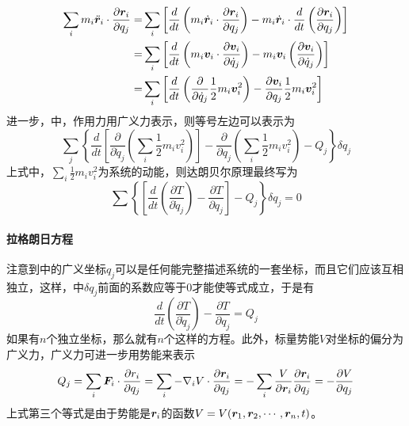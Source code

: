\begin{equation}
	\begin{aligned}
	\sum_{i} m_i \ddot{\bm{r}}_i\cdot\frac{\partial\bm{r}_i}{\partial q_j}
	=& \sum_{i}\left[\frac{d}{dt}\left(m_i\dot{\bm{r}}_i\cdot\frac{\partial\bm{r}_i}{\partial q_j}\right) - m_i\dot{\bm{r}}_i\cdot\frac{d}{dt}\left(\frac{\partial\bm{r}_i}{\partial q_j}\right)\right] \\
	=& \sum_{i}\left[\frac{d}{dt}\left(m_i\bm{v}_i\cdot\frac{\partial\bm{v}_i}{\partial \dot{q}_j}\right) - m_i\bm{v}_i\left(\frac{\partial\bm{v}_i}{\partial \dot{q}_j}\right)\right] \\
	=& \sum_{i}\left[\frac{d}{dt}\left(\frac{\partial}{\partial \dot{q}_j} \frac{1}{2}m_i\bm{v}_i^2\right) -\frac{\partial\bm{v}_i}{\partial q_j}\frac{1}{2} m_i\bm{v}_i^2\right]
	\end{aligned}
\end{equation}
进一步，中，作用力用广义力表示，则等号左边可以表示为
\begin{equation*}
	\sum_{j} \left\{\frac{d}{dt}\left[\frac{\partial}{\partial \dot{q}_j}\left(\sum_{i}\frac{1}{2}m_i v_i^2\right)\right] - \frac{\partial}{\partial q_j}\left(\sum_i \frac{1}{2}m_i v_i^2\right) - Q_j\right\}\delta q_j
\end{equation*}
上式中，$\sum_{i} \frac{1}{2}m_i v_i^2$为系统的动能，则达朗贝尔原理最终写为
\begin{equation}
	\sum \left\{ \left[\frac{d}{dt}\left(\frac{\partial T}{\partial \dot{q}_j}\right) - \frac{\partial T}{\partial q_j}\right] - Q_j \right\} \delta q_j = 0
	\label{eq:genera-dalember}
\end{equation}

\paragraph*{拉格朗日方程}
注意到中的广义坐标$q_j$可以是任何能完整描述系统的一套坐标，而且它们应该互相独立，这样，中$\delta q_j$前面的系数应等于0才能使等式成立，于是有
\begin{equation}
	\frac{d}{dt} \left(\frac{\partial T}{\partial \dot{q}_j}\right) - \frac{\partial T}{\partial q_j} = Q_j
	\label{eq:genera-kin-force}
\end{equation}
如果有$n$个独立坐标，那么就有$n$个这样的方程。此外，标量势能$V$对坐标的偏分为广义力，广义力可进一步用势能来表示
\begin{equation}
	Q_j = \sum_{i} \bm{F}_i \cdot \frac{\partial r_i}{\partial q_j} = \sum_{i} -\nabla_i V \cdot \frac{\partial \bm{r}_i}{\partial q_j} = - \sum_{i} \frac{V}{\partial \bm{r}_i} \frac{\partial \bm{r}_i}{\partial q_j} = - \frac{\partial V}{\partial q_j}
\end{equation}
上式第三个等式是由于势能是$\bm{r}_i$的函数$V = V(\bm{r}_1, \bm{r}_2, \cdots, \bm{r}_n, t)$。

